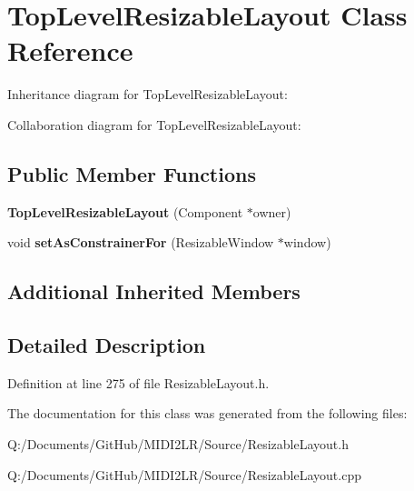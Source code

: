 \hypertarget{class_top_level_resizable_layout}{}\section{Top\+Level\+Resizable\+Layout Class Reference}
\label{class_top_level_resizable_layout}


Inheritance diagram for Top\+Level\+Resizable\+Layout\+:


Collaboration diagram for Top\+Level\+Resizable\+Layout\+:
\subsection*{Public Member Functions}
\begin{DoxyCompactItemize}
\item 
{\bfseries Top\+Level\+Resizable\+Layout} (Component $\ast$owner)\hypertarget{class_top_level_resizable_layout_acaf570bc0eabd147a11f9cf1415d44c6}{}\label{class_top_level_resizable_layout_acaf570bc0eabd147a11f9cf1415d44c6}

\item 
void {\bfseries set\+As\+Constrainer\+For} (Resizable\+Window $\ast$window)\hypertarget{class_top_level_resizable_layout_a1b367be76ae2fe9e4caa14e3c1e3f150}{}\label{class_top_level_resizable_layout_a1b367be76ae2fe9e4caa14e3c1e3f150}

\end{DoxyCompactItemize}
\subsection*{Additional Inherited Members}


\subsection{Detailed Description}


Definition at line 275 of file Resizable\+Layout.\+h.



The documentation for this class was generated from the following files\+:\begin{DoxyCompactItemize}
\item 
Q\+:/\+Documents/\+Git\+Hub/\+M\+I\+D\+I2\+L\+R/\+Source/Resizable\+Layout.\+h\item 
Q\+:/\+Documents/\+Git\+Hub/\+M\+I\+D\+I2\+L\+R/\+Source/Resizable\+Layout.\+cpp\end{DoxyCompactItemize}
